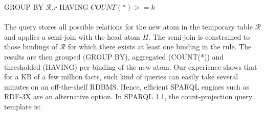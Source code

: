 {{GROUP BY $\mathcal{R}.r$ HAVING $COUNT(*) >= k$ \\ \\
}
\noindent The query stores all possible relations for the new atom in the temporary table $\mathcal{R}$ and
applies a semi-join with the head atom $H$. The semi-join is constrained to those bindings of $\mathcal{R}$ for 
which there exists at least one binding in the rule. The results are then grouped (GROUP BY), aggregated (COUNT(*)) 
and thresholded (HAVING) per binding of the new atom.
Our experience shows that for a KB of a few million facts, such kind of queries 
can easily take several minutes on an off-the-shelf RDBMS.
Hence, efficient SPARQL engines such as RDF-3X \cite{rdf3x} are an alternative option. 
In SPARQL 1.1, the count-projection query template is: \\
\\
}
